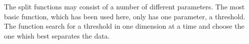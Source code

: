 The split functions may consist of a number of different parameters. The most basic function, which has been used here, only has one parameter, a threshold. The function search for a threshold in one dimension at a time and choose the one whish best separates the data. 
